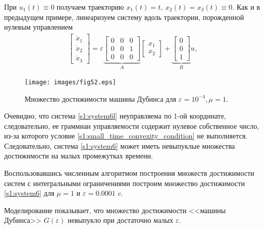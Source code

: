 \documentclass[../main.tex]{subfiles}
\begin{document}
При $  u_1(t) \equiv 0 $ получаем траекторию $ x_1(t) = t, \ x_2(t) = x_3(t) \equiv 0 $.
Как и в предыдущем примере, линеаризуем систему вдоль траектории, порожденной нулевым управлением
\begin{gather}\label{s1:system6l}
     \left[ {\begin{array}{*{20}{c}}
             {{{\dot x}_1}}\\
             {{{\dot x}_2}}\\
             {{{\dot x}_3}}
     \end{array}} \right] = \varepsilon \underbrace {\left[ {\begin{array}{*{20}{c}}
                 0&0&0\\
                 0&0&1\\
                 0&0&0
         \end{array}} \right]}_A\left[ {\begin{array}{*{20}{c}}
             {{x_1}}\\
             {{x_2}}
     \end{array}} \right] + \underbrace {\left[ {\begin{array}{*{20}{c}}
                 0\\
                 0\\
                 1
         \end{array}} \right]}_Bu ,
\end{gather}
\begin{figure}[h]
     \centering
     \texttt{[image: images/fig52.eps]}
     \caption{Множество достижимости машины Дубинса для $\varepsilon = 10^{-4}, \mu = 1$.}
     \label{s1:fig:fig3}
\end{figure}
Очевидно, что система \eqref{s1:system6l} неуправляема по 1-ой координате, следовательно, ее граммиан управляемости содержит нулевое собственное число, из-за которого условие \eqref{s1:small_time_convexity_condition} не выполняется.
Следовательно, система \eqref{s1:system6} может иметь невыпуклые множества достижимости на малых промежутках времени.
 
Воспользовавшись численным алгоритмом построения множеств достижимости систем с интегральными ограничениями \cite{GusevZykov2018} построим множество достижимости \eqref{s1:system6} для $ \mu = 1  $ и $ \varepsilon = 0.0001  $ c. 
 
Моделирование показывает, что множество достижимости <<машины Дубинса>> $G(\varepsilon)$ невыпукло при достаточно малых $ \varepsilon $.
\end{document}
